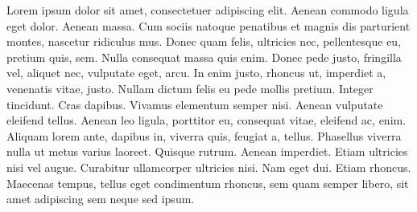 \begin{question}

	Lorem ipsum dolor sit amet, consectetuer adipiscing 
	elit. Aenean commodo ligula eget dolor. Aenean massa.
	Cum sociis natoque penatibus et magnis dis parturient
	montes, nascetur ridiculus mus. Donec quam felis, 
	ultricies nec, pellentesque eu, pretium quis, sem. 
	Nulla consequat massa quis enim. Donec pede justo, 
	fringilla vel, aliquet nec, vulputate eget, arcu. In 
	enim justo, rhoncus ut, imperdiet a, venenatis vitae,
	justo. Nullam dictum felis eu pede mollis pretium. 
	Integer tincidunt. Cras dapibus. Vivamus elementum 
	semper nisi. Aenean vulputate eleifend tellus. Aenean 
	leo ligula, porttitor eu, consequat vitae, eleifend 
	ac, enim. Aliquam lorem ante, dapibus in, viverra 
	quis, feugiat a, tellus. Phasellus viverra nulla ut 
	metus varius laoreet. Quisque rutrum. Aenean imperdiet.
	Etiam ultricies nisi vel augue. Curabitur ullamcorper 
	ultricies nisi. Nam eget dui. Etiam rhoncus. Maecenas 
	tempus, tellus eget condimentum rhoncus, sem quam 
	semper libero, sit amet adipiscing sem neque sed ipsum.
	
\end{question}
